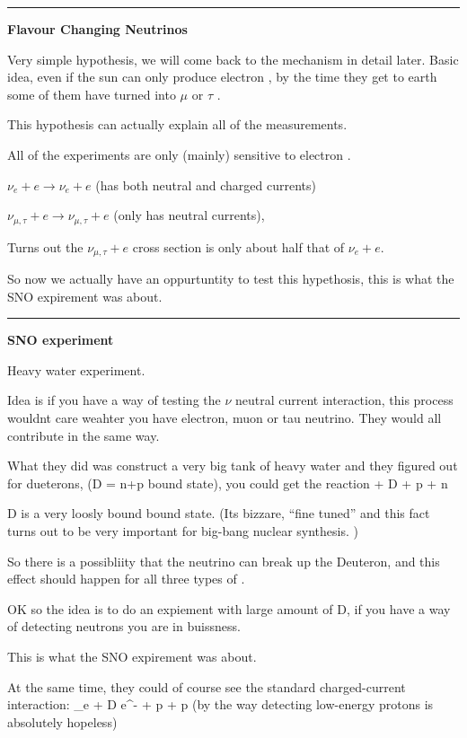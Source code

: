 {\noindent\rule{\textwidth}{1pt}

\textbf{Flavour Changing Neutrinos}

Very simple hypothesis, we will come back to the mechanism in detail later. 
Basic idea, even if the sun can only produce electron \nus, by the time they get to earth some of them have turned into $\mu$ or $\tau$ \nus. 


This hypothesis can actually explain all of the measurements.  

All of the experiments are only (mainly) sensitive to electron \nus.

\bc
$\nu_e + e \rightarrow \nu_e + e$  (has both neutral and charged currents) 
\ec

\bc
$\nu_{\mu,\tau} + e \rightarrow \nu_{\mu,\tau} + e$  (only has neutral currents), 
\ec

Turns out the $\nu_{\mu,\tau} + e$ cross section is only about half that of $\nu_e + e$.

So now we actually have an oppurtuntity to test this hypethosis, this is what the SNO expirement was about.

\noindent\rule{\textwidth}{1pt}

\textbf{SNO experiment}

Heavy water experiment.

Idea is if you have a way of testing the $\nu$ neutral current interaction, this process wouldnt care weahter you have electron, muon or tau neutrino. 
They would all contribute in the same way. 

What they did was construct a very big tank of heavy water and they figured out for dueterons, (D  = n+p bound state), you could get the reaction
\be
\nu + D \rightarrow \nu + p + n
\ee

D is a very loosly bound bound state. (Its bizzare, ``fine tuned'' and this fact turns out to be very important for big-bang nuclear synthesis. )

So there is a possibliity that the neutrino can break up the Deuteron, and this effect should happen for all three types of \nus.

OK so the idea is to do an expiement with large amount of D, if you have a way of detecting neutrons you are in buissness.

This is what the SNO expirement was about. 

At the same time, they could of course see the standard charged-current interaction:
\be
\nu_e + D \rightarrow e^- + p + p
\ee
(by the way detecting low-energy protons is absolutely hopeless)


}
